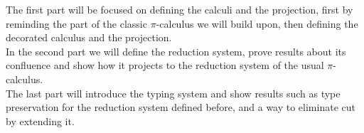 The first part will be focused on defining the calculi and the projection, first by reminding the part of the classic $\pi$-calculus we will build upon, then defining the decorated calculus and the projection.\\
In the second part we will define the reduction system, prove results about its confluence and show how it projects to the reduction system of the usual $\pi$-calculus.\\
The last part will introduce the typing system and show results such as type preservation for the reduction system defined before, and a way to eliminate cut by extending it.
